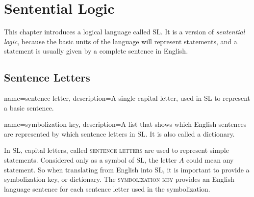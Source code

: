 \chapter{Sentential Logic}
\label{chap:SL}
\setlength{\parindent}{1em}

This chapter introduces a logical language called SL. It is a version of \emph{sentential logic}, because the basic units of the language will represent statements, and a statement is usually given by a complete sentence in English.





\section{Sentence Letters}


{
name=sentence letter,
description={A single capital letter, used in SL to represent a basic sentence.}
}

{
name=symbolization key,
description={A list that shows which English sentences are represented by which sentence letters in SL. It is also called a dictionary.}
}

In SL, capital letters, called \textsc{\glspl{sentence letter}} \label{def:sentence_letter} are used to represent simple statements. Considered only as a symbol of SL, the letter $A$ could mean any statement. So when translating from English into SL, it is important to provide a symbolization key, or dictionary. The \textsc{\gls{symbolization key}} \label{def:symbolization_key} provides an English language sentence for each sentence letter used in the symbolization.

